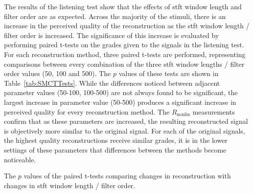 %
%
		The results of the listening test show that the effects of \acrshort{stft} window length and filter order
		are as expected. Across the majority of the stimuli, there is an increase in the perceived quality of the
		reconstruction as the \acrshort{stft} window length / filter order is increased. The significance of this
		increase is evaluated by performing paired t-tests on the grades given to the signals in the listening
		test. For each reconstruction method, three paired t-tests are performed, representing comparisons between
		every combination of the three \acrshort{stft} window lengths / filter order values (50, 100 and 500). The
		$p$ values of these tests are shown in Table~\ref{tab:SMCTTests}. While the differences noticed between
		adjacent parameter values (50-100, 100-500) are not always found to be significant, the largest increase in
		parameter value (50-500) produces a significant increase in perceived quality for every reconstruction
		method. The $R_{\mathrm{nonlin}}$ measurements confirm that as these parameters are increased, the
		resulting reconstructed signal is objectively more similar to the original signal. For each of the original
		signals, the highest quality reconstructions receive similar grades, it is in the lower settings of these
		parameters that differences between the methods become noticeable.

		\begin{table}[h!]
			\centering
			
			\caption{The $p$ values of the paired t-tests comparing changes in reconstruction
				 with changes in \acrshort{stft} window length
				 / filter order.}
			\label{tab:SMCTTests}
		\end{table}

